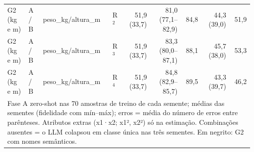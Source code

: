 \begin{table}[htbp]
\begin{tabular}{llllrrrrr}
\midrule
G2 (kg e m) & A / B & peso\_kg/altura\_m & R$^2$ & 51,9 (33,7) & 81,0 (77,1–82,9) & 84,8 & 44,3 (39,0) & 51,9 \\
G2 (kg e m) & A / B & peso\_kg/altura\_m & R$^3$ & 51,9 (33,7) & 83,3 (80,0–87,1) & 88,1 & 45,7 (38,0) & 53,3 \\
G2 (kg e m) & A / B & peso\_kg/altura\_m & R$^4$ & 51,9 (33,7) & 84,8 (82,9–85,7) & 89,5 & 43,3 (39,7) & 46,2 \\
\bottomrule
\multicolumn{9}{p{0.95\linewidth}}{\footnotesize Fase A zero-shot nas 70 amostras de treino de cada semente; médias das sementes (fidelidade com mín–máx); erros = média do número de erros entre parênteses. Atributos extras (x1·x2; x1², x2²) só na estimação. Combinações ausentes = o LLM colapsou em classe única nas três sementes. Em negrito: G2 com nomes semânticos.} \\
\end{tabular}
\end{table}
